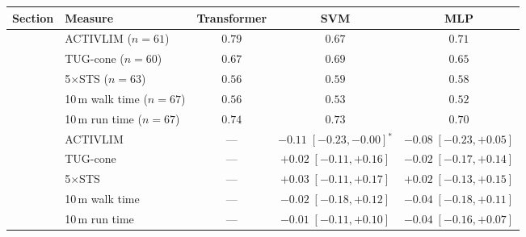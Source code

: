 \documentclass[border=6pt]{standalone}
\begin{document}
\begin{tabular}{llccc}
\toprule
Section & Measure & Transformer & SVM & MLP \\
\midrule
{} & ACTIVLIM ($n=61$) & $0.79$ & $0.67$ & $0.71$ \\
 & TUG-cone ($n=60$) & $0.67$ & $0.69$ & $0.65$ \\
 & 5$\times$STS ($n=63$) & $0.56$ & $0.59$ & $0.58$ \\
 & 10\,m walk time ($n=67$) & $0.56$ & $0.53$ & $0.52$ \\
 & 10\,m run time ($n=67$) & $0.74$ & $0.73$ & $0.70$ \\
\midrule
{} & ACTIVLIM & --- & $-0.11 \;[-0.23, -0.00]$$^{*}$ & $-0.08 \;[-0.23, +0.05]$ \\
 & TUG-cone & --- & $+0.02 \;[-0.11, +0.16]$ & $-0.02 \;[-0.17, +0.14]$ \\
 & 5$\times$STS & --- & $+0.03 \;[-0.11, +0.17]$ & $+0.02 \;[-0.13, +0.15]$ \\
 & 10\,m walk time & --- & $-0.02 \;[-0.18, +0.12]$ & $-0.04 \;[-0.18, +0.11]$ \\
 & 10\,m run time & --- & $-0.01 \;[-0.11, +0.10]$ & $-0.04 \;[-0.16, +0.07]$ \\
\bottomrule
\end{tabular}
\end{document}
